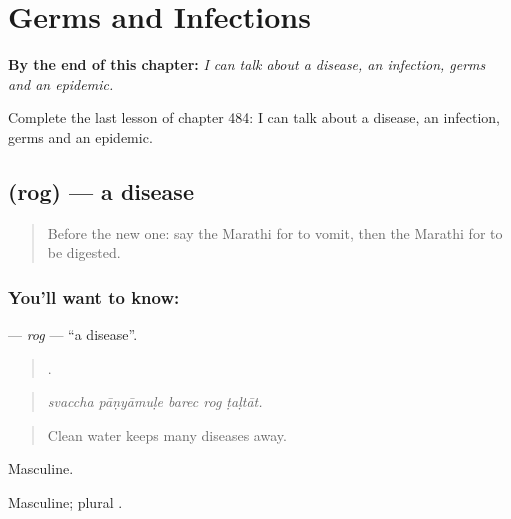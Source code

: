 
\chapter{Germs and Infections}
\label{ch:mr-germs-and-infections}

\begin{chapteropening}
\textbf{By the end of this chapter:} \emph{I can talk about a disease, an infection, germs and an epidemic.}

Complete the last lesson of chapter 484: I can talk about a disease, an infection, germs and an epidemic.
\end{chapteropening}

\section[\texorpdfstring{\mr{रोग} (rog)}{रोग (rog)}]{ (rog) — a disease}

\label{lesson:MR-C484-rog}



\begin{quote}
Before the new one: say the Marathi for to vomit, then the Marathi for to be digested.
\end{quote}

\subsection*{You'll want to know: }
\textbf{} — \emph{rog} — \textquotedblleft{}a disease\textquotedblright{}.

\begin{quote}
    .
\end{quote}

\begin{quote}
\emph{svaccha pāṇyāmuḷe barec rog ṭaḷtāt.}
\end{quote}

\begin{quote}
Clean water keeps many diseases away.
\end{quote}

Masculine.

Masculine; plural .

